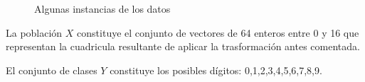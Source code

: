 \documentclass[a4]{article}
\begin{document}
\vspace{-5mm}
\begin{figure}[H]
  \centering
  \caption{Algunas instancias de los datos}
  \label{fig:digits-matrix}
\end{figure}

La población $X$ constituye el conjunto de vectores de 64 enteros
entre 0 y 16 que representan la cuadricula resultante de aplicar la
trasformación antes comentada.

El conjunto de clases $Y$ constituye los posibles dígitos:
0,1,2,3,4,5,6,7,8,9.
\end{document}
